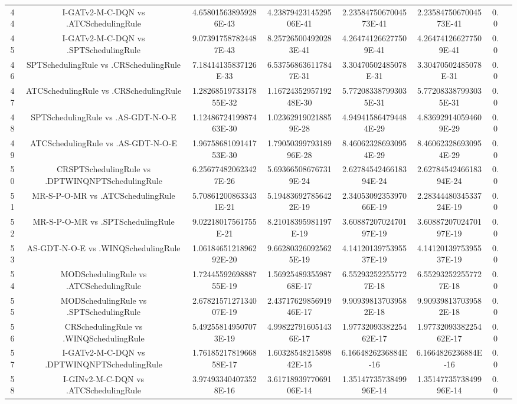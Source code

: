 \documentclass[a3paper,10pt]{article}
\begin{document}
\begin{table}[!htp]
\begin{tabular}{cccccccc}
44&I-GATv2-M-C-DQN vs .ATCSchedulingRule&4.658015638959286E-43&4.2387942314529506E-41&2.2358475067004573E-41&2.2358475067004573E-41&0.0\\
45&I-GATv2-M-C-DQN vs .SPTSchedulingRule&9.073917587824487E-43&8.257265004920283E-41&4.264741266277509E-41&4.264741266277509E-41&0.0\\
46&SPTSchedulingRule vs .CRSchedulingRule&7.18414135837126E-33&6.537568636117847E-31&3.30470502485078E-31&3.30470502485078E-31&0.0\\
47&ATCSchedulingRule vs .CRSchedulingRule&1.2826851973317855E-32&1.1672435295719248E-30&5.772083387993035E-31&5.772083387993035E-31&0.0\\
48&SPTSchedulingRule vs .AS-GDT-N-O-E&1.1248672419987463E-30&1.023629190218859E-28&4.949415864794484E-29&4.836929140594609E-29&0.0\\
49&ATCSchedulingRule vs .AS-GDT-N-O-E&1.9675868109141753E-30&1.7905039979318996E-28&8.460623286930954E-29&8.460623286930954E-29&0.0\\
50&CRSPTSchedulingRule vs .DPTWINQNPTSchedulingRule&6.256774820623427E-26&5.693665086767319E-24&2.6278454246618394E-24&2.6278454246618394E-24&0.0\\
51&MR-S-P-O-MR vs .ATCSchedulingRule&5.708612008633431E-21&5.194836927856422E-19&2.3405309235397066E-19&2.2834448034533724E-19&0.0\\
52&MR-S-P-O-MR vs .SPTSchedulingRule&9.02218017561755E-21&8.21018395981197E-19&3.6088720702470197E-19&3.6088720702470197E-19&0.0\\
53&AS-GDT-N-O-E vs .WINQSchedulingRule&1.0618465121896292E-20&9.662803260925625E-19&4.1412013975395537E-19&4.1412013975395537E-19&0.0\\
54&MODSchedulingRule vs .ATCSchedulingRule&1.7244559269888755E-19&1.5692548935598768E-17&6.552932522557727E-18&6.552932522557727E-18&0.0\\
55&MODSchedulingRule vs .SPTSchedulingRule&2.6782157127134007E-19&2.4371762985691946E-17&9.909398137039582E-18&9.909398137039582E-18&0.0\\
56&CRSchedulingRule vs .WINQSchedulingRule&5.492558149507073E-19&4.998227916051436E-17&1.9773209338225462E-17&1.9773209338225462E-17&0.0\\
57&I-GATv2-M-C-DQN vs .DPTWINQNPTSchedulingRule&1.7618521781966858E-17&1.6032854821589842E-15&6.1664826236884E-16&6.1664826236884E-16&0.0\\
58&I-GINv2-M-C-DQN vs .ATCSchedulingRule&3.974933404073528E-16&3.6171893977069106E-14&1.3514773573849996E-14&1.3514773573849996E-14&0.0\\

\end{tabular}
\end{table}
\end{document}
